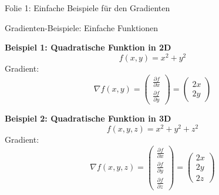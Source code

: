 \documentclass{beamer}
\begin{document}
    Folie 1: Einfache Beispiele für den Gradienten
    \begin{frame}{Gradienten-Beispiele: Einfache Funktionen}
    
        \textbf{Beispiel 1: Quadratische Funktion in 2D}
        \[
        f(x, y) = x^2 + y^2
        \]
        Gradient:
        \[
        \nabla f(x, y) = 
        \begin{pmatrix}
        \frac{\partial f}{\partial x} \\
        \frac{\partial f}{\partial y}
        \end{pmatrix}
        = 
        \begin{pmatrix}
        2x \\
        2y
        \end{pmatrix}
        \]
        
        \textbf{Beispiel 2: Quadratische Funktion in 3D}
        \[
        f(x, y, z) = x^2 + y^2 + z^2
        \]
        Gradient:
        \[
        \nabla f(x, y, z) = 
        \begin{pmatrix}
        \frac{\partial f}{\partial x} \\
        \frac{\partial f}{\partial y} \\
        \frac{\partial f}{\partial z}
        \end{pmatrix}
        = 
        \begin{pmatrix}
        2x \\
        2y \\
        2z
        \end{pmatrix}
        \]
        
        \end{frame}
        
\end{document}
